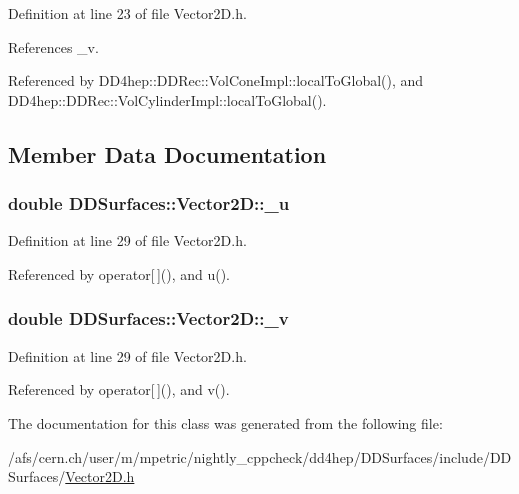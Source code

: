 Definition at line 23 of file Vector2D.h.

References \_\-v.

Referenced by DD4hep::DDRec::VolConeImpl::localToGlobal(), and DD4hep::DDRec::VolCylinderImpl::localToGlobal().

\subsection{Member Data Documentation}
\hypertarget{class_d_d_surfaces_1_1_vector2_d_a168e75ab549555cd365ce3e3e3a48093}{
\subsubsection[{\_\-u}]{\setlength{\rightskip}{0pt plus 5cm}double {\bf DDSurfaces::Vector2D::\_\-u}}}
\label{class_d_d_surfaces_1_1_vector2_d_a168e75ab549555cd365ce3e3e3a48093}


Definition at line 29 of file Vector2D.h.

Referenced by operator\mbox{[}$\,$\mbox{]}(), and u().\hypertarget{class_d_d_surfaces_1_1_vector2_d_ac52fd163a951a5a29978eb8dad3fc07e}{
\subsubsection[{\_\-v}]{\setlength{\rightskip}{0pt plus 5cm}double {\bf DDSurfaces::Vector2D::\_\-v}}}
\label{class_d_d_surfaces_1_1_vector2_d_ac52fd163a951a5a29978eb8dad3fc07e}


Definition at line 29 of file Vector2D.h.

Referenced by operator\mbox{[}$\,$\mbox{]}(), and v().

The documentation for this class was generated from the following file:\begin{DoxyCompactItemize}
\item 
/afs/cern.ch/user/m/mpetric/nightly\_\-cppcheck/dd4hep/DDSurfaces/include/DDSurfaces/\hyperlink{_vector2_d_8h}{Vector2D.h}\end{DoxyCompactItemize}
